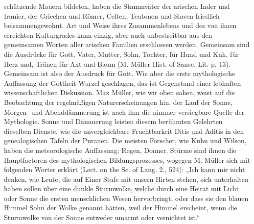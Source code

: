 \documentclass{article}
\begin{document}
schützende Mauern bildeten, haben die Stammväter der arischen Inder und Iranier, der Griechen und Römer, Celten, Teutonen und Slaven friedlich beisammengewohnt. Art und Weise ihres Zusammenlebens und des von ihnen erreichten Kulturgrades kann einzig, aber auch unbestreitbar aus den gemeinsamen Worten aller arischen Familien erschlossen werden. Gemeinsam sind die Ausdrücke für Gott, Vater, Mutter, Sohn, Tochter, für Hund und Kuh, für Herz und, Tränen für Axt und Baum (M. Müller Hist. of Sansc. Lit. p. 13). Gemeinsam ist also der Ausdruck für Gott. Wie aber die erste mythologische Auffassung der Gottheit Wurzel geschlagen, das ist Gegenstand einer lebhaften wissenschaftlichen Diskussion. Max Müller, wie wir oben sahen, weist auf die Beobachtung der regelmäßigen Naturerscheinungen hin, der Lauf der Sonne, Morgen- und Abenddämmerung ist nach ihm die nimmer versiegbare Quelle der Mythologie. Sonne und Dämmerung leisten diesem berühmten Gelehrten dieselben Dienste, wie die unvergleichbare Fruchtbarkeit Ditis und Aditis in den genealogischen Tafeln der Pur\={a}nen. Die meisten Forscher, wie Kuhn und Wilson, haben die meteorologische Auffassung; Regen, Donner, Stürme sind ihnen die Hauptfactoren des mythologischen Bildungsprozesses, wogegen M. Müller sich mit folgenden Worter erklärt (Lect. on the Sc. of Lang. 2., 524): „Ich kann mir nicht denken, wie Leute, die auf Einer Stufe mit unsern Hirten stehen, sich unterhalten haben sollen über eine dunkle Sturmwolke, welche durch eine Heirat mit Licht oder Sonne die ersten menschlichen Wesen hervorbringt, oder dass sie den blauen Himmel Sohn der Wolke genannt hätten, weil der Himmel erscheint, wenn die Sturmwolke von der Sonne entweder umarmt oder vernichtet ist.“
\end{document}
